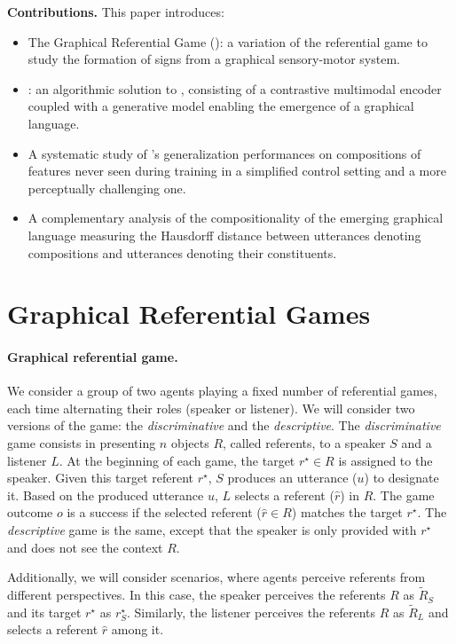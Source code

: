 \textbf{Contributions.} This paper introduces:
\begin{itemize}[noitemsep,topsep=0pt]
    \item The Graphical Referential Game (\greg): a variation of the referential game to study the formation of signs from a graphical sensory-motor system.
    \item \curves: an algorithmic solution to \greg, consisting of a contrastive multimodal encoder coupled with a generative model enabling the emergence of a graphical language.
    \item A systematic study of \curves's generalization performances on compositions of features never seen during training in a simplified control setting and a more perceptually challenging one.
    \item A complementary analysis of the compositionality of the emerging graphical language measuring the Hausdorff distance between utterances denoting compositions and utterances denoting their constituents. 
\end{itemize}


\section{Graphical Referential Games}

\label{sec:prob_def_curves}

\paragraph{Graphical referential game.}

We consider a group of two agents playing a fixed number of referential games, each time alternating their roles (speaker or listener). We will consider two versions of the game: the \textit{discriminative} and the \textit{descriptive}. The \textit{discriminative} game consists in presenting $n$ objects $R$, called referents, to a speaker $S$ and a listener $L$. At the beginning of each game, the target $r^\star \in R$ is assigned to the speaker. Given this target referent $r^\star$, $S$ produces an utterance ($u$) to designate it. Based on the produced utterance $u$, $L$ selects a referent ($\hat{r}$) in $R$. The game outcome $o$ is a success if the selected referent ($\hat{r}\in R$) matches the target $r^\star$. The \textit{descriptive} game is the same, except that the speaker is only provided with $r^\star$ and does not see the context $R$.
 
Additionally, we will consider scenarios, where agents perceive referents from different perspectives. In this case, the speaker perceives the referents $R$ as $\tilde{R}_S$ and its target $r^\star$ as $r^\star_S$. Similarly, the listener perceives the referents $R$ as $\tilde{R}_L$ and selects a referent $\hat{r}$ among it.
 
